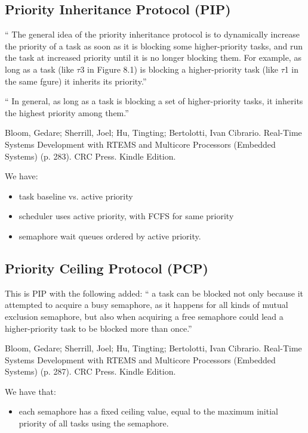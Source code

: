 \subsection{Priority Inheritance Protocol (PIP)}

``
The general idea of the priority inheritance protocol is to
dynamically increase the priority of a task
as soon as it is blocking some higher-priority tasks,
and run the  task at increased priority until it is no longer blocking them.
For example, as long as  a task (like $\tau$3 in Figure 8.1)
is blocking a higher-priority task (like $\tau$1 in the same  fgure)
it inherits its priority.''

``
In general,
as long as a task is blocking a set of higher-priority tasks,
it inherits the highest priority among them.''

Bloom, Gedare; Sherrill, Joel; Hu, Tingting; Bertolotti, Ivan Cibrario. Real-Time Systems Development with RTEMS and Multicore Processors (Embedded Systems) (p. 283). CRC Press. Kindle Edition.

We have:
\begin{itemize}
  \item task baseline vs. active priority
  \item scheduler uses active priority, with FCFS for same priority
  \item semaphore wait queues ordered by active priority.
\end{itemize}

\subsection{Priority Ceiling Protocol (PCP)}

This is PIP with the following added:
``
a task can be blocked not only because it attempted to acquire a busy semaphore,
as it happens for all kinds of mutual exclusion semaphore,
but also when acquiring a free semaphore could lead
a higher-priority task to be blocked more than once.''

Bloom, Gedare; Sherrill, Joel; Hu, Tingting; Bertolotti, Ivan Cibrario. Real-Time Systems Development with RTEMS and Multicore Processors (Embedded Systems) (p. 287). CRC Press. Kindle Edition.

We have that:
\begin{itemize}
  \item each semaphore has a fixed ceiling value,
  equal to the maximum initial priority of all tasks using the semaphore.
\end{itemize}


